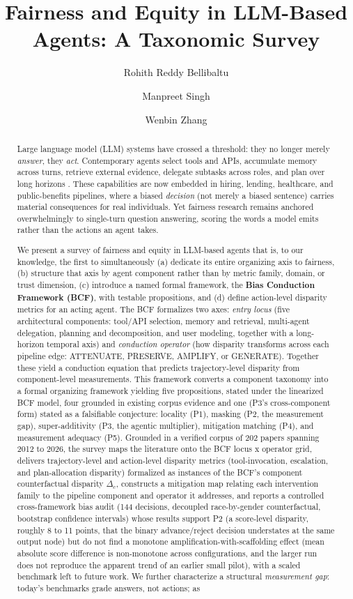 \documentclass[acmsmall,nonacm]{acmart}
\title{Fairness and Equity in LLM-Based Agents: A Taxonomic Survey}
\author{Rohith Reddy Bellibaltu}
\affiliation{%
  \institution{Florida International University}
  \city{Miami}
  \state{Florida}
  \country{USA}
}
\author{Manpreet Singh}
\affiliation{%
  \institution{Boston University}
  \city{Boston}
  \state{Massachusetts}
  \country{USA}
}
\author{Wenbin Zhang}
\affiliation{%
  \institution{Florida International University}
  \city{Miami}
  \state{Florida}
  \country{USA}
}
\begin{document}
\begin{abstract}
Large language model (LLM) systems have crossed a threshold: they no longer merely \emph{answer}, they \emph{act}. Contemporary agents select tools and APIs, accumulate memory across turns, retrieve external evidence, delegate subtasks across roles, and plan over long horizons \cite{wang2024survey,xi2023rise,yao2023react}. These capabilities are now embedded in hiring, lending, healthcare, and public-benefits pipelines, where a biased \emph{decision} (not merely a biased sentence) carries material consequences for real individuals. Yet fairness research remains anchored overwhelmingly to single-turn question answering, scoring the words a model emits rather than the actions an agent takes.

We present a survey of fairness and equity in LLM-based agents that is, to our knowledge, the first to simultaneously (a) dedicate its entire organizing axis to fairness, (b) structure that axis by agent component rather than by metric family, domain, or trust dimension, (c) introduce a named formal framework, the \textbf{Bias Conduction Framework (BCF)}, with testable propositions, and (d) define action-level disparity metrics for an acting agent. The BCF formalizes two axes: \emph{entry locus} (five architectural components: tool/API selection, memory and retrieval, multi-agent delegation, planning and decomposition, and user modeling, together with a long-horizon temporal axis) and \emph{conduction operator} (how disparity transforms across each pipeline edge: ATTENUATE, PRESERVE, AMPLIFY, or GENERATE). Together these yield a conduction equation that predicts trajectory-level disparity from component-level measurements. This framework converts a component taxonomy into a formal organizing framework yielding five propositions, stated under the linearized BCF model, four grounded in existing corpus evidence and one (P3's cross-component form) stated as a falsifiable conjecture: locality (P1), masking (P2, the measurement gap), super-additivity (P3, the agentic multiplier), mitigation matching (P4), and measurement adequacy (P5). Grounded in a verified corpus of 202 papers spanning 2012 to 2026, the survey maps the literature onto the BCF locus x operator grid, delivers trajectory-level and action-level disparity metrics (tool-invocation, escalation, and plan-allocation disparity) formalized as instances of the BCF's component counterfactual disparity $\Delta_c$, constructs a mitigation map relating each intervention family to the pipeline component and operator it addresses, and reports a controlled cross-framework bias audit (144 decisions, decoupled race-by-gender counterfactual, bootstrap confidence intervals) whose results support P2 (a score-level disparity, roughly 8 to 11 points, that the binary advance/reject decision understates at the same output node) but do not find a monotone amplification-with-scaffolding effect (mean absolute score difference is non-monotone across configurations, and the larger run does not reproduce the apparent trend of an earlier small pilot), with a scaled benchmark left to future work. We further characterize a structural \emph{measurement gap}: today's benchmarks grade answers, not actions; as 
\end{abstract}
\end{document}
